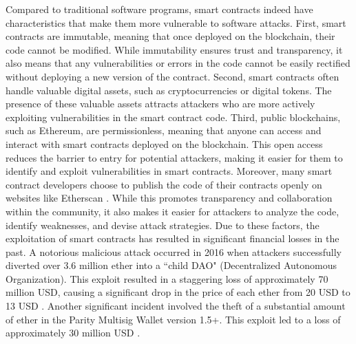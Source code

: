 \documentclass[manuscript,screen]{acmart}
\begin{document}
Compared to traditional software programs, smart contracts indeed have characteristics that make them more vulnerable to software attacks. First, smart contracts are immutable, meaning that once deployed on the blockchain, their code cannot be modified. While immutability ensures trust and transparency, it also means that any vulnerabilities or errors in the code cannot be easily rectified without deploying a new version of the contract. Second, smart contracts often handle valuable digital assets, such as cryptocurrencies or digital tokens. The presence of these valuable assets attracts attackers who are more actively exploiting vulnerabilities in the smart contract code. Third, public blockchains, such as Ethereum, are permissionless, meaning that anyone can access and interact with smart contracts deployed on the blockchain. This open access reduces the barrier to entry for potential attackers, making it easier for them to identify and exploit vulnerabilities in smart contracts. Moreover, many smart contract developers choose to publish the code of their contracts openly on websites like Etherscan \cite{etherscan}. While this promotes transparency and collaboration within the community, it also makes it easier for attackers to analyze the code, identify weaknesses, and devise attack strategies. Due to these factors, the exploitation of smart contracts has resulted in significant financial losses in the past. A notorious malicious attack occurred in 2016 when attackers successfully diverted over 3.6 million ether into a ``child DAO" (Decentralized Autonomous Organization). This exploit resulted in a staggering loss of approximately 70 million USD, causing a significant drop in the price of each ether from 20 USD to 13 USD \cite{Falkon2017}. Another significant incident involved the theft of a substantial amount of ether in the Parity Multisig Wallet version 1.5+. This exploit led to a loss of approximately 30 million USD \cite{Palladino2017}.
\end{document}
